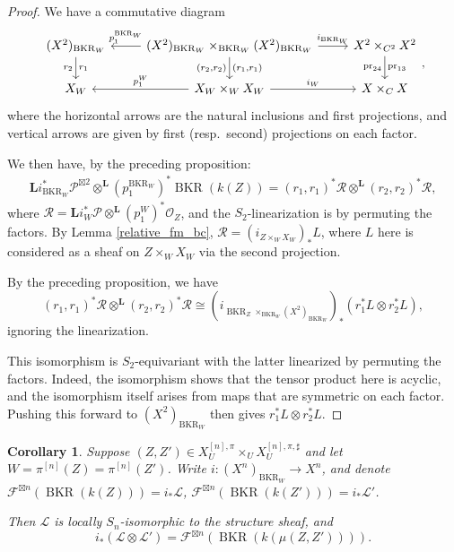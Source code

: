 \documentclass{amsart}
\theoremstyle{plain}
\newtheorem{corollary}[theorem]{Corollary}
\theoremstyle{definition}
\theoremstyle{remark}
\begin{document}
    \begin{proof}
        We have a commutative diagram
        \[\begin{tikzcd}
            (X^2)_{\operatorname{BKR}_W}\dar{r_1}[swap]{r_2}&\lar[swap]{p_1^{\operatorname{BKR}_W}} (X^2)_{\operatorname{BKR}_W}\times_{\operatorname{BKR}_W}(X^2)_{\operatorname{BKR}_W}\rar{i_{\operatorname{BKR}_W}}\dar{(r_1,r_1)}[swap]{(r_2,r_2)}&X^2\times_{C^2}X^2\dar{\operatorname{pr}_{13}}[swap]{\operatorname{pr}_{24}}\\
            X_W&\lar[swap]{p_1^W} X_W\times_WX_W\rar{i_W}&X\times_CX
        \end{tikzcd},\]
        where the horizontal arrows are the natural inclusions and first projections, and vertical arrows are given by first (resp.~second) projections on each factor.

        We then have, by the preceding proposition:
        \begin{align*}
            \mathbf Li_{\operatorname{BKR}_W}^\ast\mathcal P^{\boxtimes 2}\otimes^{\mathbf L} (p_1^{\operatorname{BKR}_W})^\ast\operatorname{BKR}(k(Z))=(r_1,r_1)^\ast\mathcal R\otimes^{\mathbf L}(r_2,r_2)^\ast\mathcal R,
        \end{align*}
        where $\mathcal R=\mathbf Li_W^\ast\mathcal P\otimes^{\mathbf L}(p_1^W)^\ast\mathcal O_Z$, and the $S_2$-linearization is by permuting the factors.
        By Lemma \ref{relative_fm_bc}, $\mathcal R=(i_{Z\times_WX_W})_\ast L$, where $L$ here is considered as a sheaf on $Z\times_WX_W$ via the second projection.

        By the preceding proposition, we have
        \[(r_1,r_1)^\ast\mathcal R\otimes^{\mathbf L}(r_2,r_2)^\ast\mathcal R\cong (i_{\operatorname{BKR}_Z\times_{\operatorname{BKR}_W}(X^2)_{\operatorname{BKR}_W}})_\ast(r_1^\ast L\otimes r_2^\ast L),\]
        ignoring the linearization.

        This isomorphism is $S_2$-equivariant with the latter linearized by permuting the factors.
        Indeed, the isomorphism shows that the tensor product here is acyclic, and the isomorphism itself arises from maps that are symmetric on each factor.
        Pushing this forward to $(X^2)_{\operatorname{BKR}_W}$ then gives $r_1^\ast L\otimes r_2^\ast L$.
    \end{proof}
    \begin{corollary}
        Suppose $(Z,Z')\in X^{[n],\pi}_U\times_UX^{[n],\pi,\sharp}_U$ and let $W=\pi^{[n]}(Z)=\pi^{[n]}(Z')$.
        Write $i:(X^n)_{\operatorname{BKR}_W}\to X^n$, and denote $\mathcal F^{\boxtimes n}(\operatorname{BKR}(k(Z)))=i_\ast \mathcal L$, $\mathcal F^{\boxtimes n}(\operatorname{BKR}(k(Z')))=i_\ast \mathcal L'$.

        Then $\mathcal L$ is locally $S_n$-isomorphic to the structure sheaf, and
        \[i_\ast(\mathcal L\otimes\mathcal L')=\mathcal F^{\boxtimes n}(\operatorname{BKR}(k(\mu(Z,Z')))).\]
    \end{corollary}
\end{document}
